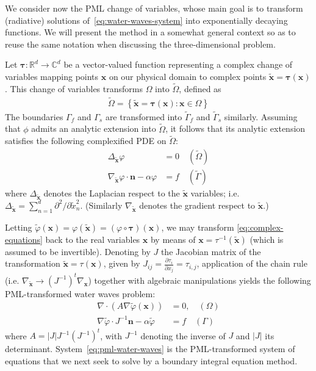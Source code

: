 \documentclass[11pt]{article}
\newcommand{\pder}[2]{\frac{\partial #1}{\partial #2}}
\newcommand{\R}{\mathbb{R}}
\newcommand{\C}{\mathbb{C}}
\newcommand{\bn}{\mathbf{n}}
\newcommand{\bx}{\mathbf{x}}
\newcommand{\btau}{\mathbf{\tau}}
\newcommand{\tvarphi}{\tilde \varphi}
\begin{document}
We consider now the PML change of variables, whose main goal is to transform
(radiative) solutions of~\cref{eq:water-waves-system} into exponentially
decaying functions. We will present the method in a somewhat general context so
as to reuse the same notation when discussing the three-dimensional problem. 

Let $\btau : \R^d \to \C^d$ be a vector-valued function representing a complex
change of variables mapping points $\bx$ on our physical domain to complex points $\tilde{\bx} = \btau(\bx)$. This change of variables transforms $\Omega$ into $\tilde{\Omega}$, defined as
\begin{align}
  \tilde{\Omega} = \left\{ \tilde{\bx} = \btau(\bx) : \bx \in \Omega \right\}
\end{align}
The boundaries $\Gamma_f$ and $\Gamma_s$ are transformed into $\tilde{\Gamma}_f$
and $\tilde{\Gamma}_s$ similarly. Assuming that $\phi$ admits an analytic
extension into $\tilde{\Omega}$, it follows that its analytic extension
satisfies the following complexified PDE on $\tilde{\Omega}$:
%
\begin{subequations}
\label{eq:complex-equations}  
\begin{align}  
    \label{eq:pml-laplace-equation}
    \Delta_{\tilde{\bx}} \varphi &=0 \quad(\tilde \Omega)\\
    \label{eq:pml-bc1} 
    \nabla_{\tilde{\bx}} \varphi \cdot \bn - \alpha \varphi &= f \quad   (\tilde{\Gamma})
\end{align}
\end{subequations}
%
where $\Delta_{\tilde{\bx}}$ denotes the Laplacian respect to the $\tilde{\bx}$
variables; i.e. $\Delta_{\tilde{\bx}} = \sum_{n=1}^d \partial^2 / \partial
\tilde{x}_n^2$. (Similarly $\nabla_{\tilde{\bx}}$ denotes the gradient respect
to $\tilde{\bx}$.)

Letting $\tvarphi(\bx) = \varphi(\tilde{\bx}) = (\varphi \circ \btau)(\bx)$, we
may transform \cref{eq:complex-equations} back to the real variables $\bx$ by
means of $\bx =\tau^{-1}(\tilde{\bx})$ (which is assumed to be invertible).
Denoting by $J$ the Jacobian matrix of the transformation $\tilde{\bx} =
\tau(\bx)$, given by $J_{ij}=\pder{\tau_i}{x_j} = \tau_{i,j}$, application of
the chain rule (i.e. $\nabla_{\tilde{\bx}} \to (J^{-1})^t \nabla_{\bx}$)
together with algebraic manipulations yields the following PML-transformed water
waves problem:
\begin{subequations}
\label{eq:pml-water-waves}  
\begin{align}
    \label{eq:pml-laplace-real}
    \nabla \cdot \left( A \nabla \tvarphi(\bx) \right) &= 0, \quad (\Omega)\\
    \label{eq:pml-bc-real} 
    \nabla \tvarphi \cdot J^{-1}\bn - \alpha \tvarphi &= f \quad (\Gamma)
\end{align}
\end{subequations}
where $A = |J|J^{-1}(J^{-1})^t$, with $J^{-1}$ denoting the inverse of $J$ and
$|J|$ its determinant. System~\cref{eq:pml-water-waves} is the PML-transformed
system of equations that we next seek to solve by a boundary integral equation
method.
\end{document}
